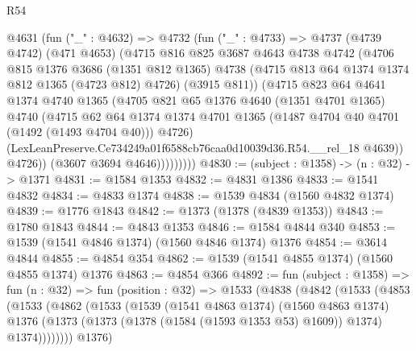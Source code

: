 \begin{lexlean}{R54}
\begin{coremodule}
              @4631
                (fun ("_" : @4632) =>
                @4732
                  (fun ("_" : @4733) =>
                  @4737
                    (@4739 @4742)
                    (@471 @4653)
                    (@4715
                      @816
                      @825
                      @3687
                      @4643
                      @4738
                      @4742
                      (@4706
                        @815
                        @1376
                        @3686
                        (@1351 @812 @1365)
                        @4738
                        (@4715 @813 @64 @1374 @1374 @812 @1365 (@4723 @812) @4726)
                        (@3915 @811))
                      (@4715
                        @823
                        @64
                        @4641
                        @1374
                        @4740
                        @1365
                        (@4705
                          @821
                          @65
                          @1376
                          @4640
                          (@1351 @4701 @1365)
                          @4740
                          (@4715
                            @62
                            @64
                            @1374
                            @1374
                            @4701
                            @1365
                            (@1487 @4704 @40 @4701 (@1492 (@1493 @4704 @40)))
                            @4726)
                          (LexLeanPreserve.Ce734249a01f6588cb76caa0d10039d36.R54.__rel_18 @4639))
                        @4726))
                    (@3607 @3694 @4646)))))))))
@4830 := (subject : @1358) -> (n : @32) -> @1371
@4831 := @1584 @1353
@4832 := @4831 @1386
@4833 := @1541 @4832
@4834 := @4833 @1374
@4838 := @1539 @4834 (@1560 @4832 @1374)
@4839 := @1776 @1843
@4842 := @1373 (@1378 (@4839 @1353))
@4843 := @1780 @1843
@4844 := @4843 @1353
@4846 := @1584 @4844 @340
@4853 := @1539 (@1541 @4846 @1374) (@1560 @4846 @1374) @1376
@4854 := @3614 @4844
@4855 := @4854 @354
@4862 := @1539 (@1541 @4855 @1374) (@1560 @4855 @1374) @1376
@4863 := @4854 @366
@4892 := fun (subject : @1358) =>
  fun (n : @32) =>
  fun (position : @32) =>
  @1533
    (@4838
      (@4842
        (@1533
          (@4853
            (@1533
              (@4862
                (@1533
                  (@1539
                    (@1541 @4863 @1374)
                    (@1560 @4863 @1374)
                    @1376
                    (@1373 (@1373 (@1378 (@1584 (@1593 @1353 @53) @1609)) @1374) @1374))))))))
      @1376)

\end{coremodule}
\end{lexlean}
